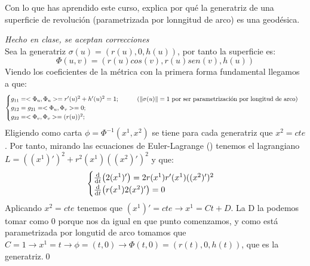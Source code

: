 \begin{problem}[11] Con lo que has aprendido este curso, explica por qué la generatriz de una superficie de revolución (parametrizada por lonngitud de arco) es una geodésica.
	
	\solution\textit{Hecho en clase, se aceptan correcciones}\\ Sea la generatriz $\sigma(u)=(r(u),0,h(u))$, por tanto la superficie es: $$\Phi(u,v)=(r(u)cos(v),r(u)sen(v),h(u))$$ Viendo los coeficientes de la métrica con la primera forma fundamental llegamos a que: $$\begin{cases}g_{11}=<\Phi_u,\Phi_u>=r'(u)^2+h'(u)^2=1;\hspace*{1cm}(\norm{\sigma(u)}=1\text{ por ser parametrización por longitud de arco)}\\g_{12}=g_{21}=<\Phi_u,\Phi_v>=0;\\g_{22}=<\Phi_v,\Phi_v>=(r(u))^2;\end{cases}$$ Eligiendo como carta $\phi=\Phi^{-1}(x^1,x^2)$ se tiene para cada generatriz que $x^2=cte$. Por tanto, mirando las ecuaciones de Euler-Lagrange () tenemos el lagrangiano $L=((x^1)')^2+r^2(x^1)((x^2)')^2$ y que:
	$$\begin{cases}\dv{t}(2(x^1)')=2r(x^1)r'(x^1)((x^2)')^2\\\dv{t}(r(x^1)2(x^2)')=0\end{cases}$$ Aplicando $x^2=cte$ tenemos que $(x^1)'=cte\longrightarrow x^1=Ct+D$. La D la podemos tomar como 0 porque nos da igual en que punto comenzamos, y como está parametrizada por longutid de arco tomamos que $C=1\longrightarrow x^1=t\longrightarrow\phi=(t,0)\longrightarrow\Phi(t,0)=(r(t),0,h(t))$, que es la generatriz.\qed
\end{problem}

